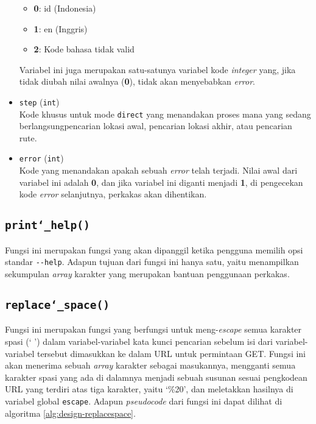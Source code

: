 \begin{itemize}
	\begin{itemize}
		\item \textbf{0}: id (Indonesia)
		\item \textbf{1}: en (Inggris)
		\item \textbf{2}: Kode bahasa tidak valid
	\end{itemize}
	
	 Variabel ini juga merupakan satu-satunya variabel kode \textit{integer} yang, jika tidak diubah nilai awalnya (\textbf{0}), tidak akan menyebabkan \textit{error}.
	\item \verb|step| (\verb|int|) \\
	Kode khusus untuk mode \verb|direct| yang menandakan proses mana yang sedang berlangsung\textemdash pencarian lokasi awal, pencarian lokasi akhir, atau pencarian rute.
	\item \verb|error| (\verb|int|) \\
	Kode yang menandakan apakah sebuah \textit{error} telah terjadi. Nilai awal dari variabel ini adalah \textbf{0}, dan jika variabel ini diganti menjadi \textbf{1}, di pengecekan kode \textit{error} selanjutnya, perkakas akan dihentikan.
\end{itemize}

\subsection{\texttt{print\char`_help()}}
\label{sec:design-code-printhelp}

Fungsi ini merupakan fungsi yang akan dipanggil ketika pengguna memilih opsi standar \verb|--help|. Adapun tujuan dari fungsi ini hanya satu, yaitu menampilkan sekumpulan \textit{array} karakter yang merupakan bantuan penggunaan perkakas.

\subsection{\texttt{replace\char`_space()}}
\label{sec:design-code-replacespace}

Fungsi ini merupakan fungsi yang berfungsi untuk meng-\textit{escape} semua karakter spasi (` ') dalam variabel-variabel kata kunci pencarian sebelum isi dari variabel-variabel tersebut dimasukkan ke dalam URL untuk permintaan GET. Fungsi ini akan menerima sebuah \textit{array} karakter sebagai masukannya, mengganti semua karakter spasi yang ada di dalamnya menjadi sebuah susunan sesuai pengkodean URL yang terdiri atas tiga karakter, yaitu `\%20', dan meletakkan hasilnya di variabel global \verb|escape|. Adapun \textit{pseudocode} dari fungsi ini dapat dilihat di algoritma \ref{alg:design-replacespace}.

